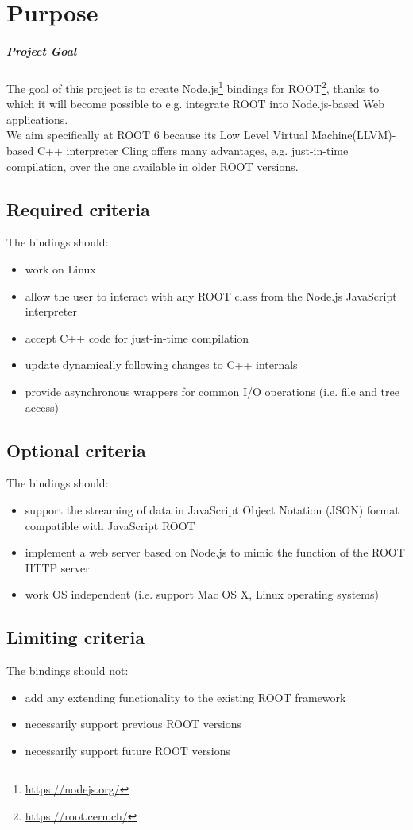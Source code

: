 \chapter{Purpose}
\paragraph{Project Goal}
The goal of this project is to create Node.js\textsuperscript{\textregistered}\footnote{\url{https://nodejs.org/}} bindings for
ROOT\footnote{\url{https://root.cern.ch/}}, thanks to which it will become possible to e.g. integrate ROOT into Node.js-based Web applications.\\
We aim specifically at ROOT 6 because its Low Level Virtual Machine(LLVM)-based C++ interpreter Cling offers many advantages, e.g. just-in-time compilation, over the one available in older ROOT versions.
\section{Required criteria}
The bindings should:
\begin{itemize}
	\item work on Linux
	\item allow the user to interact with any ROOT class from the Node.js JavaScript interpreter
	\item accept C++ code for just-in-time compilation
	\item update dynamically following changes to C++ internals
	\item provide asynchronous wrappers for common I/O operations (i.e. file and tree access)
\end{itemize}

\section{Optional criteria}
The bindings should:
\begin{itemize}
	\item support the streaming of data in JavaScript Object Notation (JSON) format compatible with JavaScript ROOT
	\item implement a web server based on Node.js to mimic the function of the ROOT HTTP server
	\item work OS independent (i.e. support Mac OS X, Linux operating systems)
\end{itemize}

\section{Limiting criteria}
The bindings should not:
\begin{itemize}
	\item add any extending functionality to the existing ROOT framework
	\item necessarily support previous ROOT versions
	\item necessarily support future ROOT versions
\end{itemize}
